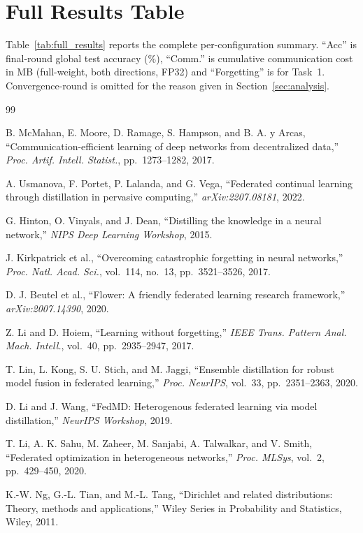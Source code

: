 \documentclass[journal]{IEEEtran}
\begin{document}
\appendix
\section{Full Results Table}
\label{app:results}

Table~\ref{tab:full_results} reports the complete per-configuration
summary. ``Acc'' is final-round global test accuracy ($\%$),
``Comm.'' is cumulative communication cost in MB (full-weight, both
directions, FP32) and ``Forgetting'' is for Task~1. Convergence-round
is omitted for the reason given in Section~\ref{sec:analysis}.




\begin{thebibliography}{99}

B. McMahan, E. Moore, D. Ramage, S. Hampson, and B. A. y Arcas,
``Communication-efficient learning of deep networks from decentralized data,''
\textit{Proc. Artif. Intell. Statist.}, pp.\ 1273--1282, 2017.

A. Usmanova, F. Portet, P. Lalanda, and G. Vega,
``Federated continual learning through distillation in pervasive computing,''
\textit{arXiv:2207.08181}, 2022.

G. Hinton, O. Vinyals, and J. Dean,
``Distilling the knowledge in a neural network,''
\textit{NIPS Deep Learning Workshop}, 2015.

J. Kirkpatrick et al.,
``Overcoming catastrophic forgetting in neural networks,''
\textit{Proc. Natl. Acad. Sci.}, vol.\ 114, no.\ 13, pp.\ 3521--3526, 2017.

D. J. Beutel et al.,
``Flower: A friendly federated learning research framework,''
\textit{arXiv:2007.14390}, 2020.

Z. Li and D. Hoiem,
``Learning without forgetting,''
\textit{IEEE Trans. Pattern Anal. Mach. Intell.}, vol.\ 40, pp.\ 2935--2947, 2017.

T. Lin, L. Kong, S. U. Stich, and M. Jaggi,
``Ensemble distillation for robust model fusion in federated learning,''
\textit{Proc. NeurIPS}, vol.\ 33, pp.\ 2351--2363, 2020.

D. Li and J. Wang,
``FedMD: Heterogenous federated learning via model distillation,''
\textit{NeurIPS Workshop}, 2019.

T. Li, A. K. Sahu, M. Zaheer, M. Sanjabi, A. Talwalkar, and V. Smith,
``Federated optimization in heterogeneous networks,''
\textit{Proc. MLSys}, vol.\ 2, pp.\ 429--450, 2020.

K.-W. Ng, G.-L. Tian, and M.-L. Tang,
``Dirichlet and related distributions: Theory, methods and applications,''
Wiley Series in Probability and Statistics, Wiley, 2011.

\end{thebibliography}
\end{document}
